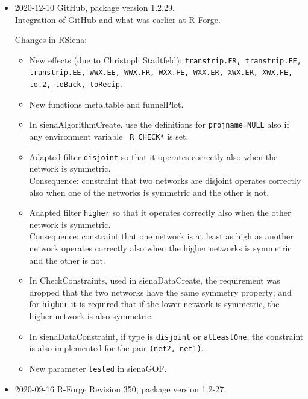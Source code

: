 \documentclass[a4paper,fleqn,11pt]{article}
\newcommand{\+}{\, + \,}
\newcommand{\sfn}[1]{\textsf{#1}}
\begin{document}
\begin{small}
\begin{itemize}
\item 2020-12-10  GitHub, package version 1.2.29.\\
Integration of GitHub and what was earlier at R-Forge.

Changes in RSiena:
\begin{itemize}
   \item New effects (due to Christoph Stadtfeld):
     \texttt{transtrip.FR, transtrip.FE, transtrip.EE, WWX.EE, WWX.FR, WXX.FE,
     WXX.ER, XWX.ER, XWX.FE, to.2, toBack, toRecip}.
   \item New functions \sfn{meta.table} and \sfn{funnelPlot}.
   \item In \sfn{sienaAlgorithmCreate}, use the definitions for \texttt{projname=NULL}
     also if any environment variable \texttt{\_R\_CHECK*} is set.
   \item Adapted filter \texttt{disjoint} so that it operates correctly
     also when the network is symmetric.\\
     Consequence: constraint that two networks are disjoint
     operates correctly also when one of the networks is symmetric
     and the other is not.
   \item Adapted filter \texttt{higher} so that it operates correctly
     also when the other network is symmetric.\\
     Consequence: constraint that one network is at least as high
     as another network operates correctly also when
     the higher networks is symmetric and the other is not.
   \item In \sfn{CheckConstraints}, used in \sfn{sienaDataCreate}, the requirement
     was dropped that the two networks have the same symmetry property;
     and for \texttt{higher} it is required that if the lower network
     is symmetric, the higher network is also symmetric.
   \item In \sfn{sienaDataConstraint}, if type is \texttt{disjoint} or \texttt{atLeastOne},
     the constraint is also implemented for the pair \texttt{(net2, net1)}.
   \item New parameter \texttt{tested} in \sfn{sienaGOF}.
\end{itemize}

\item 2020-09-16 R-Forge Revision 350, package version 1.2-27.


\end{itemize}
\end{small}
\end{document}
